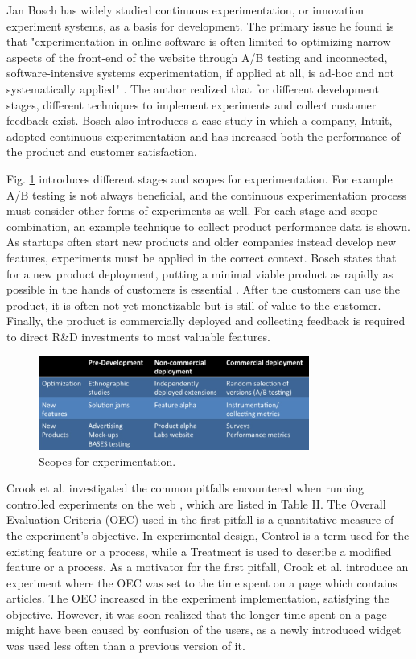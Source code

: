 \documentclass[conference]{IEEEtran}
\begin{document}
Jan Bosch has widely studied continuous experimentation, or innovation experiment systems, as a basis for development. The primary issue he found is that "experimentation in online software is often limited to optimizing narrow aspects of the front-end of the website through A/B testing and inconnected, software-intensive systems experimentation, if applied at all, is ad-hoc and not systematically applied" \cite{bosch2012building}. The author realized that for different development stages, different techniques to implement experiments and collect customer feedback exist. Bosch also introduces a case study in which a company, Intuit, adopted continuous experimentation and has increased both the performance of the product and customer satisfaction.

Fig. \ref{fig4} introduces different stages and scopes for experimentation. For example A/B testing is not always beneficial, and the continuous experimentation process must consider other forms of experiments as well. For each stage and scope combination, an example technique to collect product performance data is shown. As startups often start new products and older companies instead develop new features, experiments must be applied in the correct context. Bosch states that for a new product deployment, putting a minimal viable product as rapidly as possible in the hands of customers is essential \cite{bosch2012building}. After the customers can use the product, it is often not yet monetizable but is still of value to the customer. Finally, the product is commercially deployed and collecting feedback is required to direct R\&D investments to most valuable features.
\begin{figure}[H]
	\centering
	\includegraphics[width=3.5in]{bosch.jpg}
	\caption{Scopes for experimentation\cite{bosch2012building}.}
	\label{fig4}
\end{figure}
Crook et al. investigated the common pitfalls encountered when running controlled experiments on the web \cite{crook2009seven}, which are listed in Table II. The Overall Evaluation Criteria (OEC) used in the first pitfall is a quantitative measure of the experiment's objective. In experimental design, Control is a term used for the existing feature or a process, while a Treatment is used to describe a modified feature or a process. As a motivator for the first pitfall, Crook et al. introduce an experiment where the OEC was set to the time spent on a page which contains articles. The OEC increased in the experiment implementation, satisfying the objective. However, it was soon realized that the longer time spent on a page might have been caused by confusion of the users, as a newly introduced widget was used less often than a previous version of it. 
\end{document}
